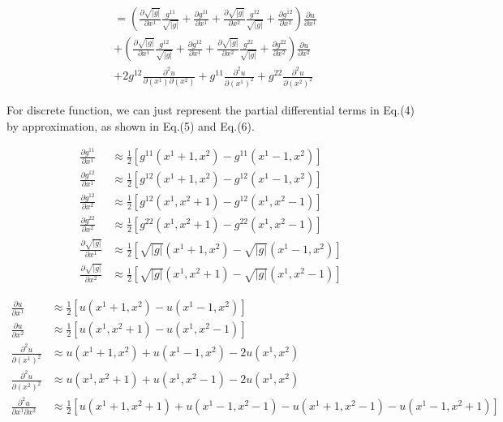 \documentclass{article}
\theoremstyle{definition}
\theoremstyle{plain}
\begin{document}
\begin{align}
    &=\left(\frac{\partial \sqrt{|g|}}{\partial x^1}\frac{g^{11}}{\sqrt{|g|}}+\frac{\partial g^{11}}{\partial x^1}+\frac{\partial \sqrt{|g|}}{\partial x^2}\frac{g^{12}}{\sqrt{|g|}}+\frac{\partial g^{12}}{\partial x^2}\right)\frac{\partial u}{\partial x^1}\\ \nonumber
    &+\left(\frac{\partial \sqrt{|g|}}{\partial x^1}\frac{g^{12}}{\sqrt{|g|}}+\frac{\partial g^{12}}{\partial x^1}+\frac{\partial \sqrt{|g|}}{\partial x^2}\frac{g^{22}}{\sqrt{|g|}}+\frac{\partial g^{22}}{\partial x^2}\right)\frac{\partial u}{\partial x^2}\\ \nonumber
    &+2g^{12}\frac{\partial^2u}{\partial(x^1)\partial(x^2)}+g^{11}\frac{\partial^2u}{\partial(x^1)^2}+g^{22}\frac{\partial^2u}{\partial(x^2)^2}
\end{align}

For discrete function, we can just represent the partial differential terms in Eq.(4) by approximation, as shown in Eq.(5) and Eq.(6).

\begin{align}
    \frac{\partial g^{11}}{\partial x^1}&\approx\frac{1}{2}[g^{11}(x^1+1,x^2)-g^{11}(x^1-1,x^2)]\\ \nonumber
    \frac{\partial g^{12}}{\partial x^1}&\approx\frac{1}{2}[g^{12}(x^1+1,x^2)-g^{12}(x^1-1,x^2)]\\ \nonumber
    \frac{\partial g^{12}}{\partial x^2}&\approx\frac{1}{2}[g^{12}(x^1,x^2+1)-g^{12}(x^1,x^2-1)]\\ \nonumber
    \frac{\partial g^{22}}{\partial x^2}&\approx\frac{1}{2}[g^{22}(x^1,x^2+1)-g^{22}(x^1,x^2-1)]\\ \nonumber
    \frac{\partial \sqrt{|g|}}{\partial x^1}&\approx\frac{1}{2}[\sqrt{|g|}(x^1+1,x^2)-\sqrt{|g|}(x^1-1,x^2)]\\ \nonumber
    \frac{\partial \sqrt{|g|}}{\partial x^2}&\approx\frac{1}{2}[\sqrt{|g|}(x^1,x^2+1)-\sqrt{|g|}(x^1,x^2-1)]
\end{align}

\begin{align}
    \frac{\partial u}{\partial x^1}&\approx \frac{1}{2}[u(x^1+1,x^2)-u(x^1-1,x^2)]\\ \nonumber
    \frac{\partial u}{\partial x^2}&\approx \frac{1}{2}[u(x^1,x^2+1)-u(x^1,x^2-1)]\\ \nonumber
    \frac{\partial^2 u}{\partial (x^1)^2}&\approx u(x^1+1,x^2)+u(x^1-1,x^2)-2u(x^1,x^2)\\ \nonumber
    \frac{\partial^2 u}{\partial (x^2)^2}&\approx u(x^1,x^2+1)+u(x^1,x^2-1)-2u(x^1,x^2)\\ \nonumber
    \frac{\partial^2 u}{\partial x^1\partial x^2}&\approx \frac{1}{2}[u(x^1+1,x^2+1)+u(x^1-1,x^2-1)-u(x^1+1,x^2-1)-u(x^1-1,x^2+1)]
\end{align}
\end{document}
